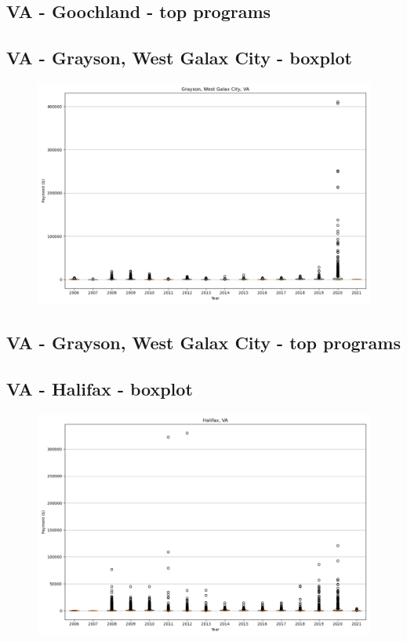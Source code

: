 \subsection*{VA - Goochland - top programs}

\newpage
\subsection*{VA - Grayson, West Galax City - boxplot}
\begin{figure}[h]
\centering
\includegraphics[width=7in]{../output/boxplots/counties/Grayson, West Galax City-VA_boxplot.png}
\end{figure}


\subsection*{VA - Grayson, West Galax City - top programs}

\newpage
\subsection*{VA - Halifax - boxplot}
\begin{figure}[h]
\centering
\includegraphics[width=7in]{../output/boxplots/counties/Halifax-VA_boxplot.png}
\end{figure}


